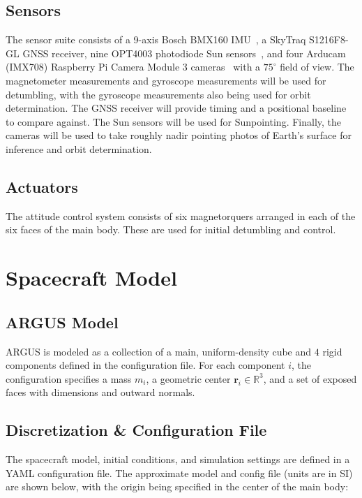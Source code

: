 \documentclass[conference,onecolumn,draftclsnofoot]{IEEEtran}
\begin{document}
\subsection{Sensors}
The sensor suite consists of a 9-axis Bosch BMX160 IMU~\cite{bosch2018bmx160}, a SkyTraq S1216F8-GL GNSS receiver, nine OPT4003 photodiode Sun sensors~\cite{ti_opt4003q1_2026}, and four Arducam (IMX708) Raspberry Pi Camera Module 3 cameras~\cite{arducam_imx708_2026} with a $75^\circ$ field of view. The magnetometer measurements and gyroscope measurements will be used for detumbling, with the gyroscope measurements also being used for orbit determination. The GNSS receiver will provide timing and a positional baseline to compare against. The Sun sensors will be used for Sunpointing. Finally, the cameras will be used to take roughly nadir pointing photos of Earth's surface for inference and orbit determination.

\subsection{Actuators}
The attitude control system consists of six magnetorquers arranged in each of the six faces of the main body. These are used for initial detumbling and control.


\clearpage
\section{Spacecraft Model}

\subsection{ARGUS Model}
ARGUS is modeled as a collection of a main, uniform-density cube and $4$ rigid components defined in the configuration file. For each component $i$, the configuration specifies a mass $m_i$, a geometric center $\mathbf{r}_i \in \mathbb{R}^3$, and a set of exposed faces with dimensions and outward normals.

\subsection{Discretization \& Configuration File}
The spacecraft model, initial conditions, and simulation settings are defined in a YAML configuration file. The approximate model and config file (units are in SI) are shown below, with the origin being specified in the center of the main body:
\end{document}
